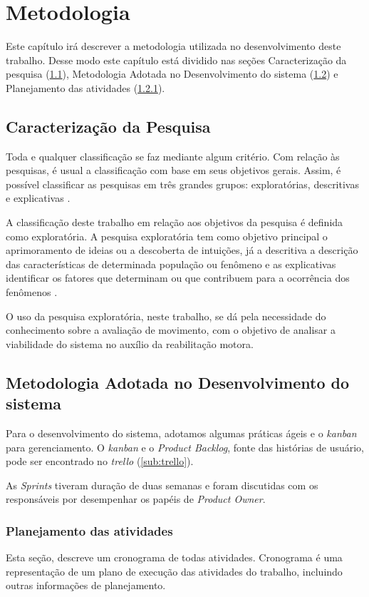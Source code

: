 
\chapter[Metodologia]{Metodologia}
  Este capítulo irá descrever a metodologia utilizada no desenvolvimento deste trabalho.
Desse modo este capítulo está dividido nas seções Caracterização da pesquisa (\ref{sec:caracPesquisa}),
Metodologia Adotada no Desenvolvimento do sistema (\ref{sec:metDesenv}) e Planejamento das atividades (\ref{Sec:Planejamento}).

\section{Caracterização da Pesquisa}\label{sec:caracPesquisa}

Toda e qualquer classificação se faz mediante algum critério. Com relação às
pesquisas, é usual a classificação com base em seus objetivos gerais. Assim, é
possível classificar as pesquisas em três grandes grupos: exploratórias, descritivas e
explicativas \cite{gil}.

A classificação deste trabalho em relação aos objetivos da pesquisa é definida como
exploratória. A pesquisa exploratória tem como objetivo principal o aprimoramento de
ideias ou a descoberta de intuições, já a descritiva a descrição das características de
determinada população ou fenômeno e as explicativas identificar os fatores que
determinam ou que contribuem para a ocorrência dos fenômenos \cite{gil}.

O uso da pesquisa exploratória, neste trabalho, se dá pela necessidade do conhecimento
 sobre a avaliação de movimento, com o objetivo de
analisar a viabilidade do sistema no auxílio da reabilitação motora.


\section{Metodologia Adotada no Desenvolvimento do sistema}\label{sec:metDesenv}
  Para o desenvolvimento do sistema, adotamos algumas práticas ágeis e o \textit{kanban} \cite{kanban1}
 para gerenciamento. O \textit{kanban} e o \textit{Product Backlog}, fonte das histórias de usuário,
   pode ser encontrado no \textit{trello} (\ref{sub:trello}).

  As \textit{Sprints} tiveram duração de duas semanas e foram
discutidas com os responsáveis por desempenhar os papéis de \textit{Product Owner}.


\subsection{Planejamento das atividades}
\label{Sec:Planejamento}
  Esta seção, descreve um cronograma de todas atividades. Cronograma  é uma representação de um plano de
execução das atividades do trabalho, incluindo  outras
informações de planejamento.

